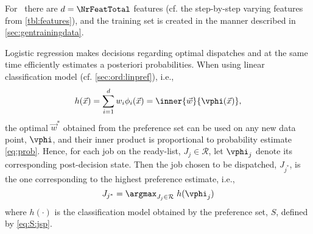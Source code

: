 For \jsp\ there are $d=\NrFeatTotal$ features (cf. the step-by-step varying features from \cref{tbl:features}), and the training set is created in the manner described in \cref{sec:gentrainingdata}.

Logistic regression makes decisions regarding optimal dispatches and at the same time efficiently estimates a posteriori probabilities. When using linear classification model (cf. \cref{sec:ord:linpref}), i.e., 
\begin{equation}\label{eq:jsp:linweights}
h(\vec{x})=\sum_{i=1}^d w_i\phi_i(\vec{x})=\inner{\vec{w}}{\vphi(\vec{x})},
\end{equation}
the optimal $\vec{w}^*$ obtained from the preference set can be used on any new data point, $\vphi$, and their inner product is proportional to probability estimate \cref{eq:prob}. 
Hence, for each job on the ready-list, $J_j\in\mathcal{R}$, let $\vphi_j$ denote its corresponding  post-decision state. Then the job chosen to be dispatched, $J_{j^*}$, is the one corresponding to the highest preference estimate, i.e.,
\begin{equation}\label{eq:lin}
J_{j^*}=\argmax_{J_j\in \mathcal{R}}\; h(\vphi_j)
\end{equation}
where $h(\cdot)$ is the classification model obtained by the preference set, $S$, defined by \cref{eq:S:jsp}. 


